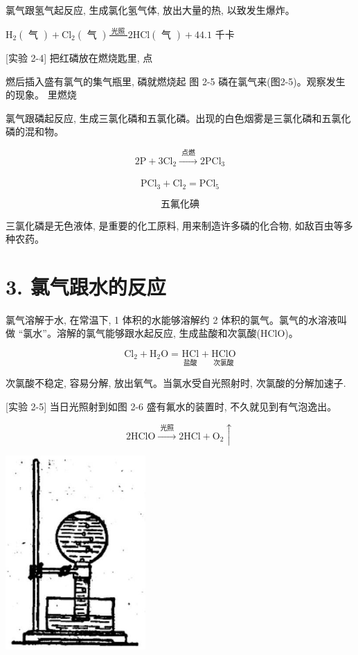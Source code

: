 \documentclass[10pt]{article}
\begin{document}
氯气跟氢气起反应, 生成氯化氢气体, 放出大量的热, 以致发生爆炸。

\({\mathrm{H}}_{2}\left( \text{ 气 }\right) + {\mathrm{{Cl}}}_{2}\left( \text{ 气 }\right) \frac{\text{ 光照 }}{}2\mathrm{{HCl}}\left( \text{ 气 }\right) + {44.1}\) 千卡

[实验 2-4] 把红磷放在燃烧匙里, 点

燃后插入盛有氯气的集气瓶里, 磷就燃烧起 图 2-5 磷在氯气来(图2-5)。观察发生的现象。 里燃烧

氯气跟磷起反应, 生成三氯化磷和五氯化磷。出现的白色烟雾是三氯化磷和五氯化磷的混和物。

\[
2\mathrm{P} + 3{\mathrm{{Cl}}}_{2}\xrightarrow[]{\text{ 点燃 }}2{\mathrm{{PCl}}}_{3}
\]

\[
{\mathrm{{PCl}}}_{3} + {\mathrm{{Cl}}}_{2} = {\mathrm{{PCl}}}_{5}
\]

\[
\text{五氟化碘}
\]

三氯化磷是无色液体, 是重要的化工原料, 用来制造许多磷的化合物, 如敌百虫等多种农药。

\section*{3. 氯气跟水的反应}

氯气溶解于水, 在常温下, 1 体积的水能够溶解约 2 体积的氯气。氯气的水溶液叫做 “氯水”。溶解的氯气能够跟水起反应, 生成盐酸和次氯酸(HClO)。

\[
{\mathrm{{Cl}}}_{2} + {\mathrm{H}}_{2}\mathrm{O} = \underset{\text{ 盐酸 }}{\mathrm{{HCl}}} + \underset{\text{ 次氯酸 }}{\mathrm{{HClO}}}
\]

次氯酸不稳定, 容易分解, 放出氧气。当氯水受自光照射时, 次氯酸的分解加速子.

[实验 2-5] 当日光照射到如图 2-6 盛有氟水的装置时, 不久就见到有气泡逸出。

\[
2\mathrm{{HClO}}\xrightarrow[]{\text{ 光照 }}2\mathrm{{HCl}} + {\mathrm{O}}_{2} \uparrow
\]

\begin{center}
\includegraphics[max width=0.4\textwidth]{images/01912d0f-097c-7e75-8f32-4f326cd86c9f_35_618497.jpg}
\end{center}
\end{document}

